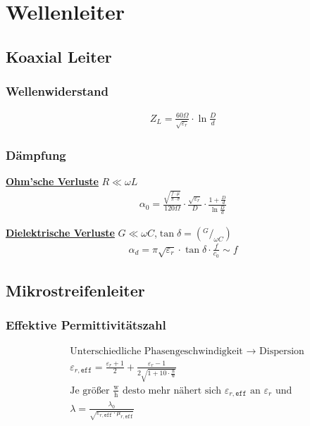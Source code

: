 \section{Wellenleiter}
\subsection{Koaxial Leiter}
\subsubsection{Wellenwiderstand}


\begin{align*}
    Z_L = \frac{60\Omega}{\sqrt{\varepsilon_r}}\cdot \ln{\frac{D}{d}}
\end{align*}

\subsubsection{Dämpfung}
\underline{\textbf{Ohm'sche Verluste}} $R\ll\omega L$
\begin{align*}
    \alpha_0 = \frac{\sqrt{\frac{f\cdot\mu}{\pi\cdot\sigma}}}{120\Omega}\cdot\frac{\sqrt{\varepsilon_r}}{D}\cdot\frac{1+\frac{D}{d}}{\ln \frac{D}{d}}
\end{align*}

\underline{\textbf{Dielektrische Verluste}} $G\ll\omega C$,$\tan\delta= (^G/_{\omega C})$
\begin{align*}
    \alpha_d = \pi\sqrt{\varepsilon_r}\cdot\tan\delta\cdot\frac{f}{c_0} \sim f
\end{align*}

\subsection{Mikrostreifenleiter}

\subsubsection{Effektive Permittivitätszahl}
\begin{align*}
     & \text{Unterschiedliche Phasengeschwindigkeit $\rightarrow$ Dispersion}                                                       \\
     & \varepsilon_{r,\texttt{eff}}  = \frac{\varepsilon_r+1}{2}+\frac{\varepsilon_r-1}{2\sqrt{1+10\cdot\frac{\text{h}}{\text{w}}}} \\
     & \text{Je größer $\frac{\text{w}}{\text{h}}$ desto mehr nähert sich $\varepsilon_{r,\texttt{eff}}$ an $\varepsilon_r$ und}    \\
     & \lambda              = \frac{\lambda_0}{\sqrt{\varepsilon_{r,\texttt{eff}}\cdot\mu_{r,\texttt{eff}}}}
\end{align*}
